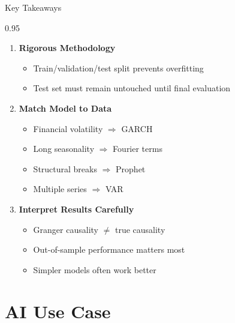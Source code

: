\documentclass[9pt, aspectratio=169, t]{beamer}
\begin{document}
\begin{frame}{Key Takeaways}
    \begin{cminipage}{0.95\textwidth}
    \small
    \begin{enumerate}
        \item \textbf{Rigorous Methodology}
        \begin{itemize}
            \item Train/validation/test split prevents overfitting
            \item Test set must remain untouched until final evaluation
        \end{itemize}

        \vspace{0.2cm}

        \item \textbf{Match Model to Data}
        \begin{itemize}
            \item Financial volatility $\Rightarrow$ GARCH
            \item Long seasonality $\Rightarrow$ Fourier terms
            \item Structural breaks $\Rightarrow$ Prophet
            \item Multiple series $\Rightarrow$ VAR
        \end{itemize}

        \vspace{0.2cm}

        \item \textbf{Interpret Results Carefully}
        \begin{itemize}
            \item Granger causality $\neq$ true causality
            \item Out-of-sample performance matters most
            \item Simpler models often work better
        \end{itemize}
    \end{enumerate}
    \end{cminipage}
\end{frame}

\section{AI Use Case}
\end{document}
